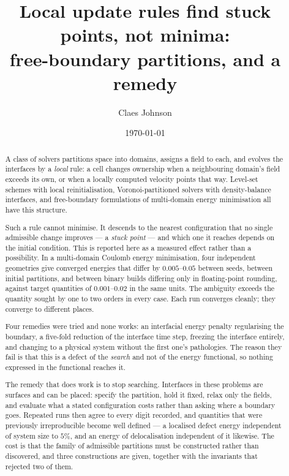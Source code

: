 \documentclass[11pt]{article}
\title{Local update rules find stuck points, not minima:\\
\large free-boundary partitions, and a remedy}
\author[1]{Claes Johnson}
\affil[1]{KTH Royal Institute of Technology, SE-100 44 Stockholm, Sweden \\
\texttt{claesjohnson@gmail.com}}
\date{\today}
\begin{document}
\maketitle

\begin{abstract}
\noindent A class of solvers partitions space into domains, assigns a field to each, and evolves the
interfaces by a \emph{local} rule: a cell changes ownership when a neighbouring domain's field
exceeds its own, or when a locally computed velocity points that way. Level-set schemes with local
reinitialisation, Voronoi-partitioned solvers with density-balance interfaces, and free-boundary
formulations of multi-domain energy minimisation all have this structure.

Such a rule cannot minimise. It descends to the nearest configuration that no single admissible
change improves --- a \emph{stuck point} --- and which one it reaches depends on the initial
condition. This is reported here as a measured effect rather than a possibility. In a
multi-domain Coulomb energy minimisation, four independent geometries give converged energies that
differ by $0.005$--$0.05$ between seeds, between initial partitions, and between binary builds
differing only in floating-point rounding, against target quantities of $0.001$--$0.02$ in the same
units. The ambiguity exceeds the quantity sought by one to two orders in every case. Each run
converges cleanly; they converge to different places.

Four remedies were tried and none works: an interfacial energy penalty regularising the boundary, a
five-fold reduction of the interface time step, freezing the interface entirely, and changing to a
physical system without the first one's pathologies. The reason they fail is that this is a defect
of the \emph{search} and not of the energy functional, so nothing expressed in the functional
reaches it.

The remedy that does work is to stop searching. Interfaces in these problems are surfaces and can be
placed: specify the partition, hold it fixed, relax only the fields, and evaluate what a stated
configuration costs rather than asking where a boundary goes. Repeated runs then agree to every
digit recorded, and quantities that were previously irreproducible become well defined --- a
localised defect energy independent of system size to $5\%$, and an energy of delocalisation
independent of it likewise. The cost is that the family of admissible partitions must be
constructed rather than discovered, and three constructions are given, together with the invariants
that rejected two of them.
\end{abstract}
\end{document}
